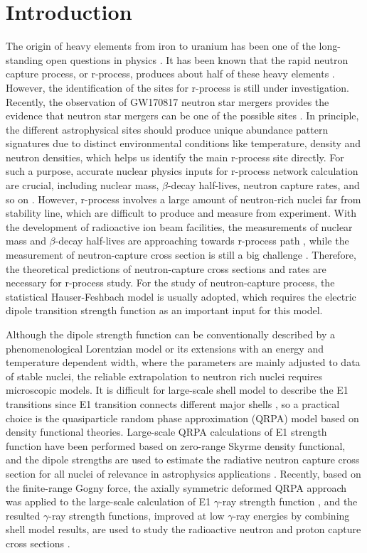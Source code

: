\documentclass[aps,preprint,showpacs,superscriptaddress,floatfix]{revtex4-1} %
\begin{document}
\section{Introduction}
\label{intro}
The origin of heavy elements from iron to uranium has been one of the long-standing open questions in physics \cite{discover}. It has been known that the rapid neutron capture process, or r-process, produces about half of these heavy elements \cite{Placeholder:01}. However, the identification of the sites for r-process is still under investigation. Recently, the observation of GW170817 neutron star mergers provides the evidence that neutron star mergers can be one of the possible sites \cite{Placeholder:02}. In principle, the different astrophysical sites should produce unique abundance pattern signatures due to distinct environmental conditions like temperature, density and neutron densities, which helps us identify the main r-process site directly\cite{Placeholder:03}.  For such a purpose, accurate nuclear physics inputs for r-process network calculation are crucial, including nuclear mass, $\beta$-decay half-lives, neutron capture rates, and so on \cite{Placeholder:04}. However, r-process involves a large amount of neutron-rich nuclei far from stability line, which are difficult to produce and measure from experiment. With the development of radioactive ion beam facilities, the measurements of nuclear mass and $\beta$-decay half-lives are approaching towards r-process path \cite{Placeholder:05}, while the measurement of neutron-capture cross section is still a big challenge \cite{Placeholder:06}. Therefore, the theoretical predictions of neutron-capture cross sections and rates are necessary for r-process study. For the study of neutron-capture process, the statistical Hauser-Feshbach \cite{Placeholder:07} model is usually adopted, which requires the electric dipole transition strength function as an important input for this model.

Although the dipole strength function can be conventionally described by a phenomenological Lorentzian model or its extensions with an energy and temperature dependent width\cite{Capote2009, Nucl_Data_Sheets_110_3107}, where the parameters are mainly adjusted to data of stable nuclei, the reliable extrapolation to neutron rich nuclei requires microscopic models. It is difficult for large-scale shell model to describe the E1 transitions since E1 transition connects different major shells \cite{Placeholder:08}, so a practical choice is the quasiparticle random phase approximation (QRPA) model based on density functional theories. Large-scale QRPA calculations of E1 strength function have been performed based on zero-range Skyrme density functional, and the dipole strengths are used to estimate the radiative neutron capture cross section for all nuclei of relevance in astrophysics applications \cite{Goriely2002, Goriely2004}. Recently, based on the finite-range Gogny force, the axially symmetric deformed QRPA approach was applied to the large-scale calculation of E1 $\gamma$-ray strength function \cite{Martini2016}, and the resulted $\gamma$-ray strength functions, improved at low $\gamma$-ray energies by combining shell model results, are used to study the radioactive neutron and proton capture cross sections \cite{Goriely2018}.
\end{document}

